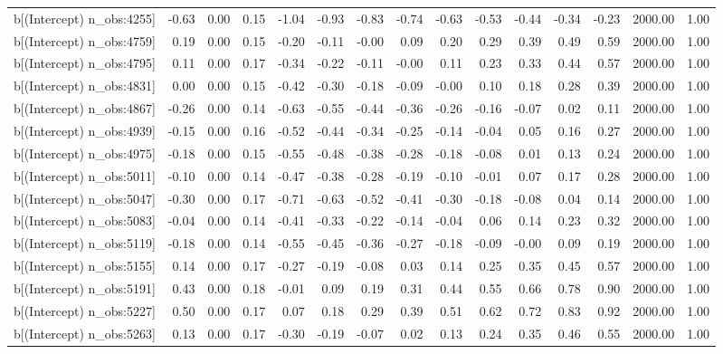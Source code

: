 \begin{table}[ht]
\begin{tabular}{rrrrrrrrrrrrrrr}
  b[(Intercept) n\_obs:4255] & -0.63 & 0.00 & 0.15 & -1.04 & -0.93 & -0.83 & -0.74 & -0.63 & -0.53 & -0.44 & -0.34 & -0.23 & 2000.00 & 1.00 \\ 
  b[(Intercept) n\_obs:4759] & 0.19 & 0.00 & 0.15 & -0.20 & -0.11 & -0.00 & 0.09 & 0.20 & 0.29 & 0.39 & 0.49 & 0.59 & 2000.00 & 1.00 \\ 
  b[(Intercept) n\_obs:4795] & 0.11 & 0.00 & 0.17 & -0.34 & -0.22 & -0.11 & -0.00 & 0.11 & 0.23 & 0.33 & 0.44 & 0.57 & 2000.00 & 1.00 \\ 
  b[(Intercept) n\_obs:4831] & 0.00 & 0.00 & 0.15 & -0.42 & -0.30 & -0.18 & -0.09 & -0.00 & 0.10 & 0.18 & 0.28 & 0.39 & 2000.00 & 1.00 \\ 
  b[(Intercept) n\_obs:4867] & -0.26 & 0.00 & 0.14 & -0.63 & -0.55 & -0.44 & -0.36 & -0.26 & -0.16 & -0.07 & 0.02 & 0.11 & 2000.00 & 1.00 \\ 
  b[(Intercept) n\_obs:4939] & -0.15 & 0.00 & 0.16 & -0.52 & -0.44 & -0.34 & -0.25 & -0.14 & -0.04 & 0.05 & 0.16 & 0.27 & 2000.00 & 1.00 \\ 
  b[(Intercept) n\_obs:4975] & -0.18 & 0.00 & 0.15 & -0.55 & -0.48 & -0.38 & -0.28 & -0.18 & -0.08 & 0.01 & 0.13 & 0.24 & 2000.00 & 1.00 \\ 
  b[(Intercept) n\_obs:5011] & -0.10 & 0.00 & 0.14 & -0.47 & -0.38 & -0.28 & -0.19 & -0.10 & -0.01 & 0.07 & 0.17 & 0.28 & 2000.00 & 1.00 \\ 
  b[(Intercept) n\_obs:5047] & -0.30 & 0.00 & 0.17 & -0.71 & -0.63 & -0.52 & -0.41 & -0.30 & -0.18 & -0.08 & 0.04 & 0.14 & 2000.00 & 1.00 \\ 
  b[(Intercept) n\_obs:5083] & -0.04 & 0.00 & 0.14 & -0.41 & -0.33 & -0.22 & -0.14 & -0.04 & 0.06 & 0.14 & 0.23 & 0.32 & 2000.00 & 1.00 \\ 
  b[(Intercept) n\_obs:5119] & -0.18 & 0.00 & 0.14 & -0.55 & -0.45 & -0.36 & -0.27 & -0.18 & -0.09 & -0.00 & 0.09 & 0.19 & 2000.00 & 1.00 \\ 
  b[(Intercept) n\_obs:5155] & 0.14 & 0.00 & 0.17 & -0.27 & -0.19 & -0.08 & 0.03 & 0.14 & 0.25 & 0.35 & 0.45 & 0.57 & 2000.00 & 1.00 \\ 
  b[(Intercept) n\_obs:5191] & 0.43 & 0.00 & 0.18 & -0.01 & 0.09 & 0.19 & 0.31 & 0.44 & 0.55 & 0.66 & 0.78 & 0.90 & 2000.00 & 1.00 \\ 
  b[(Intercept) n\_obs:5227] & 0.50 & 0.00 & 0.17 & 0.07 & 0.18 & 0.29 & 0.39 & 0.51 & 0.62 & 0.72 & 0.83 & 0.92 & 2000.00 & 1.00 \\ 
  b[(Intercept) n\_obs:5263] & 0.13 & 0.00 & 0.17 & -0.30 & -0.19 & -0.07 & 0.02 & 0.13 & 0.24 & 0.35 & 0.46 & 0.55 & 2000.00 & 1.00 \\ 

\end{tabular}
\end{table}

